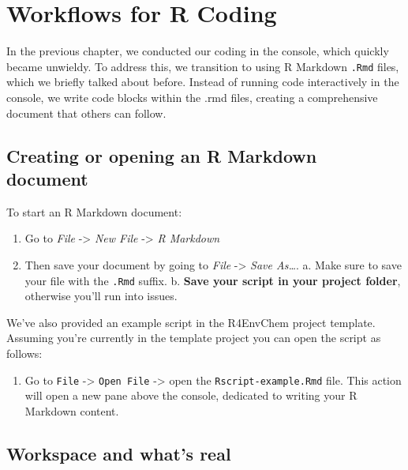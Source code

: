 \documentclass[
]{book}
\providecommand{\tightlist}{%
  \setlength{\itemsep}{0pt}\setlength{\parskip}{0pt}}
\begin{document}
\hypertarget{workflows-for-r-coding}{%
\chapter{Workflows for R Coding}\label{workflows-for-r-coding}}

In the previous chapter, we conducted our coding in the console, which quickly became unwieldy. To address this, we transition to using R Markdown \texttt{.Rmd} files, which we briefly talked about before. Instead of running code interactively in the console, we write code blocks within the .rmd files, creating a comprehensive document that others can follow.

\hypertarget{creating-or-opening-an-r-markdown-document}{%
\section{Creating or opening an R Markdown document}\label{creating-or-opening-an-r-markdown-document}}

To start an R Markdown document:

\begin{enumerate}
\def\labelenumi{\arabic{enumi}.}
\tightlist
\item
  Go to \emph{File} -\textgreater{} \emph{New File} -\textgreater{} \emph{R Markdown}
\item
  Then save your document by going to \emph{File} -\textgreater{} \emph{Save As\ldots{}}.
  a. Make sure to save your file with the \texttt{.Rmd} suffix.
  b. \textbf{Save your script in your project folder}, otherwise you'll run into issues.
\end{enumerate}

We've also provided an example script in the R4EnvChem project template. Assuming you're currently in the template project you can open the script as follows:

\begin{enumerate}
\def\labelenumi{\arabic{enumi}.}
\tightlist
\item
  Go to \texttt{File} -\textgreater{} \texttt{Open\ File} -\textgreater{} open the \texttt{Rscript-example.Rmd} file. This action will open a new pane above the console, dedicated to writing your R Markdown content.
\end{enumerate}

\hypertarget{workspace-and-whats-real}{%
\section{Workspace and what's real}\label{workspace-and-whats-real}}
\end{document}
